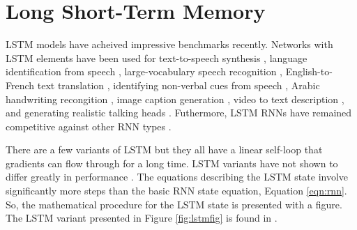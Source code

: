\section{Long Short-Term Memory} %

LSTM models have acheived impressive benchmarks recently.
%
Networks with LSTM elements have been used for
text-to-speech synthesis \cite{Fan2014},
language identification from speech \cite{Gonzalez-Dominguez2014},
large-vocabulary speech recognition \cite{Sak2014},
English-to-French text translation  \cite{Sutskever2014},
identifying non-verbal cues from speech \cite{Brueckner2014},
Arabic handwriting recongition \cite{Bluche},
image caption generation \cite{Vinyals2015},
video to text description \cite{Venugopalan2014},
and generating realistic talking heads \cite{Fan2015}.
%
Futhermore, LSTM RNNs have remained competitive against other RNN types \cite{Jozefowicz2015}.


There are a few variants of LSTM but they all have a linear self-loop that gradients can flow through for a long time.
%
LSTM variants have not shown to differ greatly in performance \cite{Greff2015}.
%
The equations describing the LSTM state involve significantly more steps than the basic RNN state equation, Equation \ref{eqn:rnn}.
%
So, the mathematical procedure for the LSTM state is presented with a figure.
%
The LSTM variant presented in Figure \ref{fig:lstmfig} is found in \cite{Graves2013b}.

